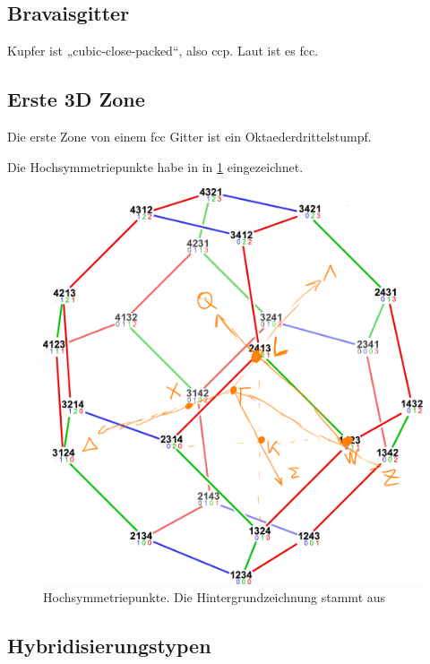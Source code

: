 \subsection{Bravaisgitter}

Kupfer ist „cubic-close-packed“, also ccp.
\cite{webelements/copper/crystal_structure} Laut \cite{wikipedia/Copper} ist es
fcc.

\subsection{Erste 3D Zone}

Die erste Zone von einem fcc Gitter ist ein Oktaederdrittelstumpf.
\cite{akopian/brillouin-zones}

Die Hochsymmetriepunkte habe in in \cref{fig:okt} eingezeichnet.
\cite[Kapitel~3.1, Seite~33]{Keyling/ab-initio}

\begin{figure}
	\centering
	\includegraphics[width=\textwidth]{Permutohedron-Zeichnung.pdf}
	\caption{%
		Hochsymmetriepunkte. Die Hintergrundzeichnung stammt aus
		\cite{Mate2code/permutohedron}
	}
	\label{fig:okt}
\end{figure}


\subsection{Hybridisierungstypen}

